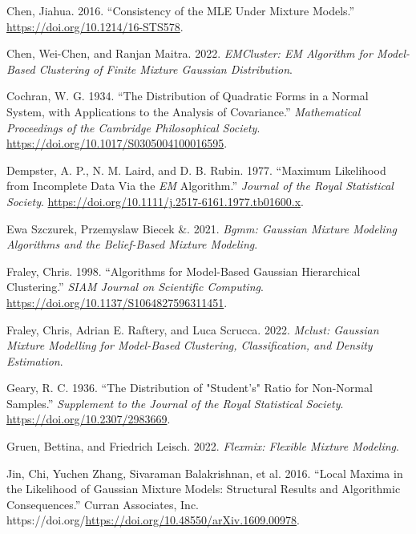 \begin{CSLReferences}{1}{0}
\leavevmode{}%
Chen, Jiahua. 2016. {``Consistency of the {MLE} Under Mixture Models.''} \url{https://doi.org/10.1214/16-STS578}.

\leavevmode{}%
Chen, Wei-Chen, and Ranjan Maitra. 2022. \emph{EMCluster: EM Algorithm for Model-Based Clustering of Finite Mixture Gaussian Distribution}.

\leavevmode{}%
Cochran, W. G. 1934. {``The Distribution of Quadratic Forms in a Normal System, with Applications to the Analysis of Covariance.''} \emph{Mathematical Proceedings of the Cambridge Philosophical Society}. \url{https://doi.org/10.1017/S0305004100016595}.

\leavevmode{}%
Dempster, A. P., N. M. Laird, and D. B. Rubin. 1977. {``Maximum {Likelihood} from {Incomplete Data Via} the {\emph{EM}} {Algorithm}.''} \emph{Journal of the Royal Statistical Society}. \url{https://doi.org/10.1111/j.2517-6161.1977.tb01600.x}.

\leavevmode{}%
Ewa Szczurek, Przemyslaw Biecek \&. 2021. \emph{Bgmm: Gaussian Mixture Modeling Algorithms and the Belief-Based Mixture Modeling}.

\leavevmode{}%
Fraley, Chris. 1998. {``Algorithms for {Model-Based Gaussian Hierarchical Clustering}.''} \emph{SIAM Journal on Scientific Computing}. \url{https://doi.org/10.1137/S1064827596311451}.

\leavevmode{}%
Fraley, Chris, Adrian E. Raftery, and Luca Scrucca. 2022. \emph{Mclust: Gaussian Mixture Modelling for Model-Based Clustering, Classification, and Density Estimation}.

\leavevmode{}%
Geary, R. C. 1936. {``The {Distribution} of "{Student}'s" {Ratio} for {Non-Normal Samples}.''} \emph{Supplement to the Journal of the Royal Statistical Society}. \url{https://doi.org/10.2307/2983669}.

\leavevmode{}%
Gruen, Bettina, and Friedrich Leisch. 2022. \emph{Flexmix: Flexible Mixture Modeling}.

\leavevmode{}%
Jin, Chi, Yuchen Zhang, Sivaraman Balakrishnan, et al. 2016. {``Local {Maxima} in the {Likelihood} of {Gaussian Mixture Models}: {Structural Results} and {Algorithmic Consequences}.''} Curran Associates, Inc. https://doi.org/\url{https://doi.org/10.48550/arXiv.1609.00978}.


\end{CSLReferences}
